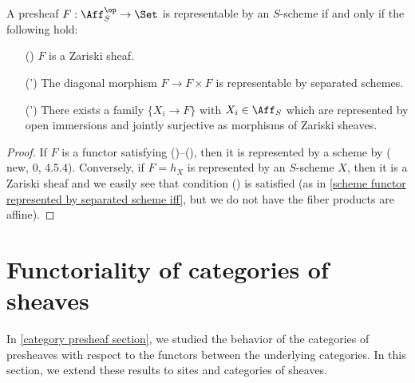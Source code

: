 \begin{proposition}\label{scheme functor represented by scheme iff}
A presheaf $F:\Aff_S^{\op}\to\Set$ is representable by an $S$-scheme
if and only if the following hold:
\begin{enumerate}
    \item[(\rmnum{1})] $F$ is a Zariski sheaf.
    \item[(\rmnum{2}')] The diagonal morphism $F\to F\times F$ is representable by separated schemes.
    \item[(\rmnum{3}')] There exists a family $\{X_i\to F\}$ with $X_i\in\Aff_S$ which are represented by open immersions and jointly surjective as morphisms of Zariski sheaves. 
\end{enumerate}
\end{proposition}
\begin{proof}
If $F$ is a functor satisfying ()--(), then it is represented by a scheme by (\cite{EGA1} new, 0, 4.5.4). Conversely, if $F=h_X$ is represented by an $S$-scheme $X$, then it is a Zariski sheaf and we easily see that condition () is satisfied (as in \cref{scheme functor represented by separated scheme iff}, but we do not have the fiber products are affine). 
\end{proof}

\section{Functoriality of categories of sheaves}
In \autoref{category presheaf section}, we studied the behavior of the categories of presheaves with respect to the functors between the underlying categories. In this section, we extend these results to sites and categories of sheaves.
